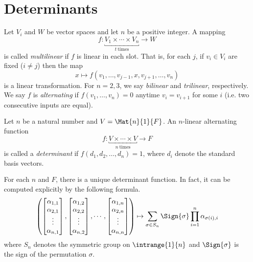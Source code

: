 \documentclass{memoir}
\begin{document}
\setcounter{section}{20}
\section{Determinants}

\begin{dfn} \mbox{}
\begin{enumerate*}
\item Let $V_i$ and $W$ be vector spaces and let $n$ be a positive integer. A mapping \[f : \underbracket{V_1 \times \cdots \times V_n}_{t\ \text{times}} \rightarrow W\] is called \emph{multilinear} if $f$ is linear in each slot. That is, for each $j$, if $v_i \in V_i$ are fixed ($i \neq j$) then the map \[ x \mapsto f(v_1,\ldots,v_{j-1}, x, v_{j+1},\ldots,v_n) \] is a linear transformation. For $n=2,3$, we say \emph{bilinear} and \emph{trilinear}, respectively. We say $f$ is \emph{alternating} if $f(v_1,\ldots,v_n) = 0$ anytime $v_i=v_{i+1}$ for some $i$ (i.e. two consecutive inputs are equal).
\item Let $n$ be a natural number and $V = \Mat{n}{1}{F}$. An $n$-linear alternating function \[f : \underbracket{V \times \cdots \times V}_{n\ \text{times}} \rightarrow F\] is called a \emph{determinant} if $f(d_1,d_2,\ldots,d_n) = 1$, where $d_i$ denote the standard basis vectors.
\end{enumerate*}
\end{dfn}

\begin{prp}
For each $n$ and $F$, there is a unique determinant function. In fact, it can be computed explicitly by the following formula. \[ \left( \begin{bmatrix} \alpha_{1,1} \\ \alpha_{2,1} \\ \vdots \\ \alpha_{n,1} \end{bmatrix}, \begin{bmatrix} \alpha_{1,2} \\ \alpha_{2,2} \\ \vdots \\ \alpha_{n,2} \end{bmatrix}, \cdots, \begin{bmatrix} \alpha_{1,n} \\ \alpha_{2,n} \\ \vdots \\ \alpha_{n,n} \end{bmatrix} \right) \mapsto \sum_{\sigma \in S_n} \Sign{\sigma} \prod_{i=1}^n \alpha_{\sigma(i),i} \] where $S_n$ denotes the symmetric group on $\intrange{1}{n}$ and $\Sign{\sigma}$ is the sign of the permutation $\sigma$.
\end{prp}
\end{document}
